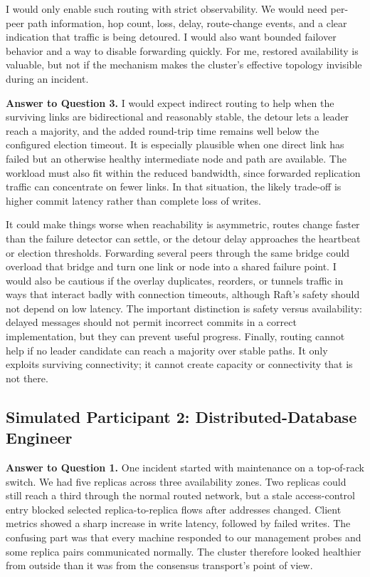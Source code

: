 \documentclass[11pt,a4paper]{article}
\begin{document}
I would only enable such routing with strict observability. We would need per-peer path information, hop count, loss, delay, route-change events, and a clear indication that traffic is being detoured. I would also want bounded failover behavior and a way to disable forwarding quickly. For me, restored availability is valuable, but not if the mechanism makes the cluster's effective topology invisible during an incident.

\textbf{Answer to Question 3.}
I would expect indirect routing to help when the surviving links are bidirectional and reasonably stable, the detour lets a leader reach a majority, and the added round-trip time remains well below the configured election timeout. It is especially plausible when one direct link has failed but an otherwise healthy intermediate node and path are available. The workload must also fit within the reduced bandwidth, since forwarded replication traffic can concentrate on fewer links. In that situation, the likely trade-off is higher commit latency rather than complete loss of writes.

It could make things worse when reachability is asymmetric, routes change faster than the failure detector can settle, or the detour delay approaches the heartbeat or election thresholds. Forwarding several peers through the same bridge could overload that bridge and turn one link or node into a shared failure point. I would also be cautious if the overlay duplicates, reorders, or tunnels traffic in ways that interact badly with connection timeouts, although Raft's safety should not depend on low latency. The important distinction is safety versus availability: delayed messages should not permit incorrect commits in a correct implementation, but they can prevent useful progress. Finally, routing cannot help if no leader candidate can reach a majority over stable paths. It only exploits surviving connectivity; it cannot create capacity or connectivity that is not there.

\subsection{Simulated Participant 2: Distributed-Database Engineer}

\textbf{Answer to Question 1.}
One incident started with maintenance on a top-of-rack switch. We had five replicas across three availability zones. Two replicas could still reach a third through the normal routed network, but a stale access-control entry blocked selected replica-to-replica flows after addresses changed. Client metrics showed a sharp increase in write latency, followed by failed writes. The confusing part was that every machine responded to our management probes and some replica pairs communicated normally. The cluster therefore looked healthier from outside than it was from the consensus transport's point of view.
\end{document}
